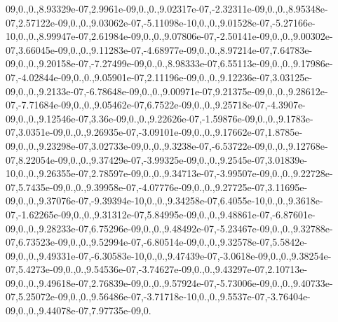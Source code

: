 \begin{DoxyCompactItemize}
\/09,0.,0.,8.\-93329e-\/07,2.\-9961e-\/09,0.,0.,9.\-02317e-\/07,-\/2.\-32311e-\/09,0.,0.,8.\-95348e-\/07,2.\-57122e-\/09,0.,0.,9.\-03062e-\/07,-\/5.\-11098e-\/10,0.,0.,9.\-01528e-\/07,-\/5.\-27166e-\/10,0.,0.,8.\-99947e-\/07,2.\-61984e-\/09,0.,0.,9.\-07806e-\/07,-\/2.\-50141e-\/09,0.,0.,9.\-00302e-\/07,3.\-66045e-\/09,0.,0.,9.\-11283e-\/07,-\/4.\-68977e-\/09,0.,0.,8.\-97214e-\/07,7.\-64783e-\/09,0.,0.,9.\-20158e-\/07,-\/7.\-27499e-\/09,0.,0.,8.\-98333e-\/07,6.\-55113e-\/09,0.,0.,9.\-17986e-\/07,-\/4.\-02844e-\/09,0.,0.,9.\-05901e-\/07,2.\-11196e-\/09,0.,0.,9.\-12236e-\/07,3.\-03125e-\/09,0.,0.,9.\-2133e-\/07,-\/6.\-78648e-\/09,0.,0.,9.\-00971e-\/07,9.\-21375e-\/09,0.,0.,9.\-28612e-\/07,-\/7.\-71684e-\/09,0.,0.,9.\-05462e-\/07,6.\-7522e-\/09,0.,0.,9.\-25718e-\/07,-\/4.\-3907e-\/09,0.,0.,9.\-12546e-\/07,3.\-36e-\/09,0.,0.,9.\-22626e-\/07,-\/1.\-59876e-\/09,0.,0.,9.\-1783e-\/07,3.\-0351e-\/09,0.,0.,9.\-26935e-\/07,-\/3.\-09101e-\/09,0.,0.,9.\-17662e-\/07,1.\-8785e-\/09,0.,0.,9.\-23298e-\/07,3.\-02733e-\/09,0.,0.,9.\-3238e-\/07,-\/6.\-53722e-\/09,0.,0.,9.\-12768e-\/07,8.\-22054e-\/09,0.,0.,9.\-37429e-\/07,-\/3.\-99325e-\/09,0.,0.,9.\-2545e-\/07,3.\-01839e-\/10,0.,0.,9.\-26355e-\/07,2.\-78597e-\/09,0.,0.,9.\-34713e-\/07,-\/3.\-99507e-\/09,0.,0.,9.\-22728e-\/07,5.\-7435e-\/09,0.,0.,9.\-39958e-\/07,-\/4.\-07776e-\/09,0.,0.,9.\-27725e-\/07,3.\-11695e-\/09,0.,0.,9.\-37076e-\/07,-\/9.\-39394e-\/10,0.,0.,9.\-34258e-\/07,6.\-4055e-\/10,0.,0.,9.\-3618e-\/07,-\/1.\-62265e-\/09,0.,0.,9.\-31312e-\/07,5.\-84995e-\/09,0.,0.,9.\-48861e-\/07,-\/6.\-87601e-\/09,0.,0.,9.\-28233e-\/07,6.\-75296e-\/09,0.,0.,9.\-48492e-\/07,-\/5.\-23467e-\/09,0.,0.,9.\-32788e-\/07,6.\-73523e-\/09,0.,0.,9.\-52994e-\/07,-\/6.\-80514e-\/09,0.,0.,9.\-32578e-\/07,5.\-5842e-\/09,0.,0.,9.\-49331e-\/07,-\/6.\-30583e-\/10,0.,0.,9.\-47439e-\/07,-\/3.\-0618e-\/09,0.,0.,9.\-38254e-\/07,5.\-4273e-\/09,0.,0.,9.\-54536e-\/07,-\/3.\-74627e-\/09,0.,0.,9.\-43297e-\/07,2.\-10713e-\/09,0.,0.,9.\-49618e-\/07,2.\-76839e-\/09,0.,0.,9.\-57924e-\/07,-\/5.\-73006e-\/09,0.,0.,9.\-40733e-\/07,5.\-25072e-\/09,0.,0.,9.\-56486e-\/07,-\/3.\-71718e-\/10,0.,0.,9.\-5537e-\/07,-\/3.\-76404e-\/09,0.,0.,9.\-44078e-\/07,7.\-97735e-\/09,0.\-
\end{DoxyCompactItemize}

